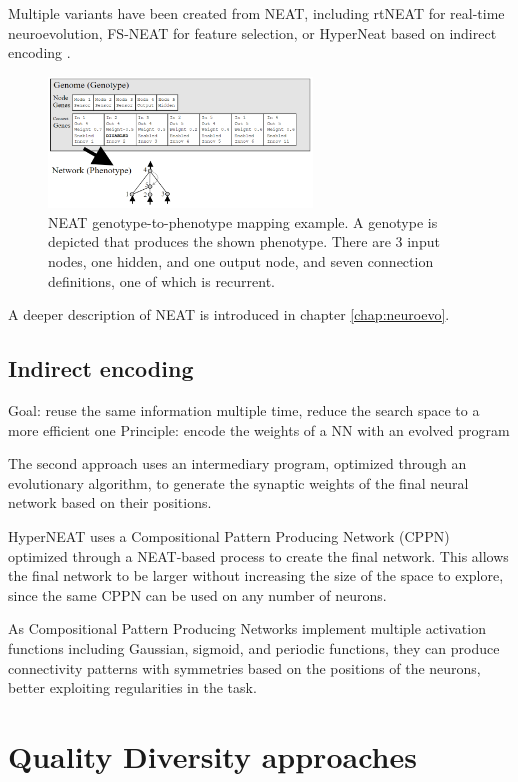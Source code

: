 Multiple variants have been created from NEAT, including rtNEAT \cite{rtNEAT} for real-time neuroevolution, FS-NEAT \cite{FS-NEAT} for feature selection, or HyperNeat based on indirect encoding \cite{HyperNEAT}.

\begin{figure}[H]
 \centering
 \captionsetup{justification=centering, margin=0.5cm}
 \includegraphics[width=7cm]{images/neat.png}
 \caption{\label{NEAT}NEAT genotype-to-phenotype mapping example. A genotype is depicted that produces the shown phenotype. There are 3 input nodes, one hidden, and one output node, and seven connection definitions, one of which is recurrent. \cite{NEAT_2}}
 \label{fig:NEAT}
\end{figure}

A deeper description of NEAT is introduced in chapter \ref{chap:neuroevo}.

\subsection{Indirect encoding}
Goal: reuse the same information multiple time, reduce the search space to a more efficient one
Principle: encode the weights of a NN with an evolved program

The second approach uses an intermediary program, optimized through an evolutionary algorithm, to generate the synaptic weights of the final neural network based on their positions. 

HyperNEAT \cite{HyperNEAT} uses a Compositional Pattern Producing Network (CPPN) \cite{CPPN} optimized through a NEAT-based process to create the final network. This allows the final network to be larger without increasing the size of the space to explore, since the same CPPN can be used on any number of neurons.

As Compositional Pattern Producing Networks implement multiple activation functions including Gaussian, sigmoid, and periodic functions, they can produce connectivity patterns with symmetries based on the positions of the neurons, better exploiting regularities in the task.

\section{Quality Diversity approaches}


